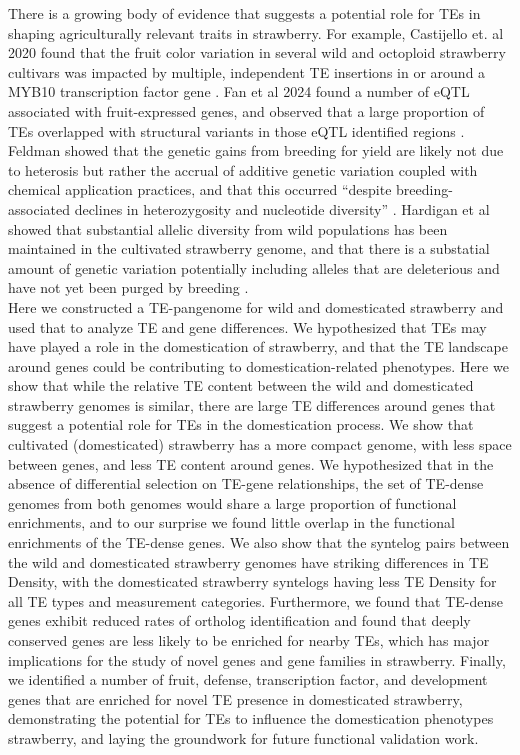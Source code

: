 \documentclass[fleqn,10pt]{olplainarticle}
\begin{document}
There is a growing body of evidence that suggests a potential role for TEs in shaping agriculturally relevant traits in strawberry.
For example, Castijello et. al 2020 found that the fruit color variation in several wild and octoploid strawberry cultivars was impacted by multiple, independent TE insertions in or around a MYB10 transcription factor gene \cite{Castillejo2020}.
Fan et al 2024 found a number of eQTL associated with fruit-expressed genes, and observed that a large proportion of TEs overlapped with structural variants in those eQTL identified regions \cite{Fan2022}.
Feldman showed that the genetic gains from breeding for yield are likely not due to heterosis but rather the accrual of additive genetic variation coupled with chemical application practices, and that this occurred ``despite breeding-associated declines in heterozygosity and nucleotide diversity'' \cite{Feldman2024}.
Hardigan et al showed that substantial allelic diversity from wild populations has been maintained in the cultivated strawberry genome, and that there is a substatial amount of genetic variation potentially including alleles that are deleterious and have not yet been purged by breeding \cite{Hardigan2020}. \\


Here we constructed a TE-pangenome for wild and domesticated strawberry and used that to analyze TE and gene differences.
We hypothesized that TEs may have played a role in the domestication of strawberry, and that the TE landscape around genes could be contributing to domestication-related phenotypes.
Here we show that while the relative TE content between the wild and domesticated strawberry genomes is similar, there are large TE differences around genes that suggest a potential role for TEs in the domestication process.
We show that cultivated (domesticated) strawberry has a more compact genome, with less space between genes, and less TE content around genes.
We hypothesized that in the absence of differential selection on TE-gene relationships, the set of TE-dense genomes from both genomes would share a large proportion of functional enrichments, and to our surprise we found little overlap in the functional enrichments of the TE-dense genes.
We also show that the syntelog pairs between the wild and domesticated strawberry genomes have striking differences in TE Density, with the domesticated strawberry syntelogs having less TE Density for all TE types and measurement categories.
Furthermore, we found that TE-dense genes exhibit reduced rates of ortholog identification and found that deeply conserved genes are less likely to be enriched for nearby TEs, which has major implications for the study of novel genes and gene families in strawberry.
Finally, we identified a number of fruit, defense, transcription factor, and development genes that are enriched for novel TE presence in domesticated strawberry, demonstrating the potential for TEs to influence the domestication phenotypes strawberry, and laying the groundwork for future functional validation work. \\ 
\end{document}
